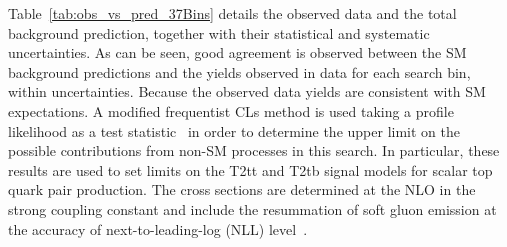 Table~\ref{tab:obs_vs_pred_37Bins} details the observed data and the total background prediction, together with their statistical and systematic uncertainties. 
%
As can be seen, good agreement is observed between the SM background predictions and the yields observed in data for each search bin, within uncertainties.
%
%
Because the observed data yields are consistent with SM expectations.
%
A modified frequentist CLs method is used taking a profile likelihood as a test statistic~\cite{aread,tjunk,ATL-PHYS-PUB-2011-011} in order to determine the upper limit on the possible contributions from non-SM processes in this search. 
%
In particular, these results are used to set limits on the T2tt and T2tb signal models for scalar top quark pair production. 
%
The cross sections are determined at the NLO in the strong coupling constant and include the resummation of soft gluon emission at the accuracy of next-to-leading-log (NLL) level~\cite{bib-nlo-nll-01,bib-nlo-nll-02,bib-nlo-nll-03,bib-nlo-nll-04,bib-nlo-nll-05,SMSXsecUnc}.


